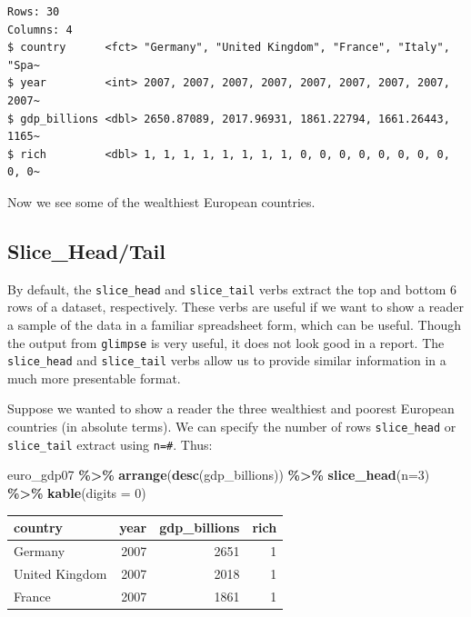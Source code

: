 \documentclass[
]{book}
\makeatletter
\newenvironment{Shaded}{\begin{snugshade}}{\end{snugshade}}
\newcommand{\AttributeTok}[1]{\textcolor[rgb]{0.27,0.27,0.27}{#1}}
\newcommand{\DecValTok}[1]{\textcolor[rgb]{0.06,0.06,0.06}{#1}}
\newcommand{\FunctionTok}[1]{\textcolor[rgb]{0.27,0.27,0.27}{\textbf{#1}}}
\newcommand{\NormalTok}[1]{#1}
\newcommand{\SpecialCharTok}[1]{\textcolor[rgb]{0.43,0.43,0.43}{\textbf{#1}}}
\newenvironment{kframe}{%
\medskip{}
\setlength{\fboxsep}{.8em}
 \def\at@end@of@kframe{}%
 \ifinner\ifhmode%
  \def\at@end@of@kframe{\end{minipage}}%
  \begin{minipage}{\columnwidth}%
 \fi\fi%
 \def\FrameCommand##1{\hskip\@totalleftmargin \hskip-\fboxsep
 \colorbox{shadecolor}{##1}\hskip-\fboxsep
     \hskip-\linewidth \hskip-\@totalleftmargin \hskip\columnwidth}%
 \MakeFramed {\advance\hsize-\width
   \@totalleftmargin\z@ \linewidth\hsize
   \@setminipage}}%
 {\par\unskip\endMakeFramed%
 \at@end@of@kframe}
\renewenvironment{Shaded}{\begin{kframe}}{\end{kframe}}
\makeatother
\begin{document}
\begin{verbatim}
Rows: 30
Columns: 4
$ country      <fct> "Germany", "United Kingdom", "France", "Italy", "Spa~
$ year         <int> 2007, 2007, 2007, 2007, 2007, 2007, 2007, 2007, 2007~
$ gdp_billions <dbl> 2650.87089, 2017.96931, 1861.22794, 1661.26443, 1165~
$ rich         <dbl> 1, 1, 1, 1, 1, 1, 1, 1, 0, 0, 0, 0, 0, 0, 0, 0, 0, 0~
\end{verbatim}

Now we see some of the wealthiest European countries.

\hypertarget{slice_headtail}{%
\subsection{Slice\_Head/Tail}\label{slice_headtail}}

By default, the \texttt{slice\_head} and \texttt{slice\_tail} verbs extract the top and bottom 6 rows of a dataset, respectively. These verbs are useful if we want to show a reader a sample of the data in a familiar spreadsheet form, which can be useful. Though the output from \texttt{glimpse} is very useful, it does not look good in a report. The \texttt{slice\_head} and \texttt{slice\_tail} verbs allow us to provide similar information in a much more presentable format.

Suppose we wanted to show a reader the three wealthiest and poorest European countries (in absolute terms). We can specify the number of rows \texttt{slice\_head} or \texttt{slice\_tail} extract using \texttt{n=\#}. Thus:

\begin{Shaded}
\begin{Highlighting}[]
\NormalTok{euro\_gdp07 }\SpecialCharTok{\%\textgreater{}\%} 
  \FunctionTok{arrange}\NormalTok{(}\FunctionTok{desc}\NormalTok{(gdp\_billions)) }\SpecialCharTok{\%\textgreater{}\%} 
  \FunctionTok{slice\_head}\NormalTok{(}\AttributeTok{n=}\DecValTok{3}\NormalTok{) }\SpecialCharTok{\%\textgreater{}\%} 
  \FunctionTok{kable}\NormalTok{(}\AttributeTok{digits =} \DecValTok{0}\NormalTok{)}
\end{Highlighting}
\end{Shaded}

\begin{tabular}{l|r|r|r}
\hline
country & year & gdp\_billions & rich\\
\hline
Germany & 2007 & 2651 & 1\\
\hline
United Kingdom & 2007 & 2018 & 1\\
\hline
France & 2007 & 1861 & 1\\
\hline
\end{tabular}
\end{document}

